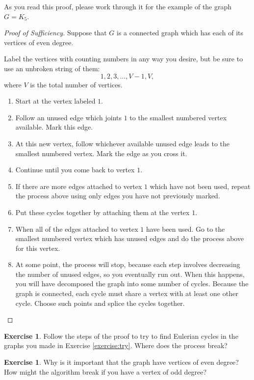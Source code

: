 \documentclass[12pt,letterpaper]{article}
\theoremstyle{definition}
\newtheorem{exercise}[question]{Exercise}
\begin{document}
As you read this proof, please work through it for the example of the graph $G=K_5$.

\begin{proof}[Proof of Sufficiency]
Suppose that $G$ is a connected graph which has each of its vertices of even degree.

Label the vertices with counting numbers in any way you desire, but be sure to use an unbroken string of them:
\[
1, 2, 3, \ldots, V-1, V,
\]
where $V$ is the total number of vertices.

\begin{enumerate}
\item Start at the vertex labeled $1$. 
\item Follow an unused edge which joints $1$ to the smallest numbered vertex available. Mark this edge.
\item At this new vertex, follow whichever available unused edge leads to the smallest numbered vertex. Mark
the edge as you cross it.
\item Continue until you come back to vertex $1$.
\item If there are more edges attached to vertex $1$ which have not been used, repeat the process above
using only edges you have not previously marked. 
\item Put these cycles together by attaching them at the vertex $1$.
\item When all of the edges attached to vertex $1$ have been used. Go to the smallest numbered vertex which
has unused edges and do the process above for this vertex.
\item At some point, the process will stop, because each step involves decreasing the number of unused edges,
so you eventually run out. When this happens, you will have decomposed the graph into some number of cycles.
Because the graph is connected, each cycle must share a vertex with at least one other cycle. Choose such points
and splice the cycles together.
\end{enumerate}
\end{proof}

\begin{exercise}
Follow the steps of the proof to try to find Eulerian cycles in the graphs you made in Exercise \ref{exercise:try}.
Where does the process break?
\end{exercise}

\begin{exercise}
Why is it important that the graph have vertices of even degree? How might the algorithm break if you have 
a vertex of odd degree?
\end{exercise}
\end{document}
